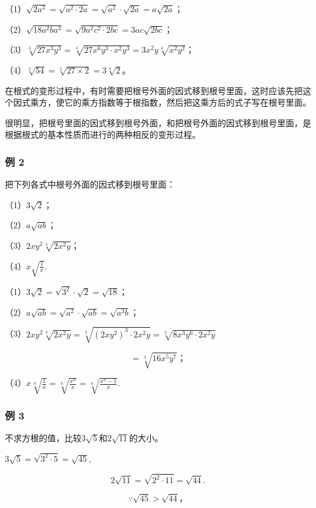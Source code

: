 （1）\(\sqrt{2a^3} = \sqrt{a^2 \cdot 2a} = \sqrt{a^2} \cdot \sqrt{2a} = a\sqrt{2a}\)；

（2）\(\sqrt{18a^2b a^3} = \sqrt{9a^2c^2 \cdot 2bc} = 3ac\sqrt{2bc}\)；

（3）\(\sqrt[3]{27x^3y^3} = \sqrt[3]{27x^{6}y^3 \cdot x^2y^3} = 3x^2y\sqrt[3]{x^2y^2}\)；

（4）\(\sqrt[3]{54} = \sqrt[3]{27 \times 2} = 3\sqrt[3]{2}\)。

在根式的变形过程中，有时需要把根号外面的因式移到根号里面，这时应该先把这个因式乘方，使它的乘方指数等于根指数，然后把这乘方后的式子写在根号里面。

很明显，把根号里面的因式移到根号外面，和把根号外面的因式移到根号里面，是根据根式的基本性质而进行的两种相反的变形过程。

\subsubsection{例 2}

把下列各式中根号外面的因式移到根号里面：

（1）\(3\sqrt{2}\)；

（2）\(a\sqrt{ab}\)；

（3）\(2xy^{2}\sqrt[3]{2x^{2}y}\)；

（4）\(x\sqrt{\frac{1}{x}}.\)

（1）\(3\sqrt{2} = \sqrt{3^2} \cdot \sqrt{2} = \sqrt{18}\)；

（2）\(a\sqrt{ab} = \sqrt{a^2} \cdot \sqrt{ab} = \sqrt{a^3b}\)；

（3）\(2xy^{2}\sqrt[3]{2x^{2}y} = \sqrt[3]{(2xy^{2})^{3}\cdot 2x^{2}y} = \sqrt[3]{8x^{3}y^{6}\cdot 2x^{2}y}\)

\[
= \sqrt[3]{16 x ^ {5} y ^ {7}}\text{；}
\]

（4）\(x\sqrt[n]{\frac{1}{x}} = \sqrt[n]{\frac{x^n}{x}} = \sqrt[n]{\frac{x^n - 1}{x}}.\)

\subsubsection{例 3}

不求方根的值，比较\(3 \sqrt{5}\)和\(2 \sqrt{11}\)的大小。

 \(3\sqrt{5} = \sqrt{3^2\cdot 5} = \sqrt{45},\)

\[
2 \sqrt {11} = \sqrt {2 ^ {2} \cdot 11} = \sqrt {44}.
\]

\[
\because \sqrt {45} > \sqrt {44}\text{，}
\]

